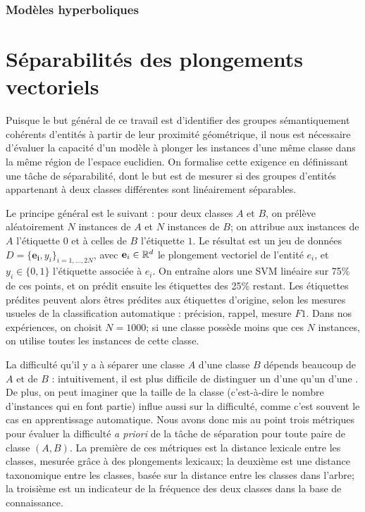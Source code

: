 \subsubsection{Modèles hyperboliques}


\section{Séparabilités des plongements vectoriels}

Puisque le but général de ce travail est d'identifier des groupes sémantiquement cohérents d'entités à partir de leur proximité géométrique, il nous est nécessaire d'évaluer la capacité d'un modèle à plonger les instances d'une même classe dans la même région de l'espace euclidien. On formalise cette exigence en définissant une tâche de séparabilité, dont le but est de mesurer si des groupes d'entités appartenant à deux classes différentes sont linéairement séparables.

Le principe général est le suivant : pour deux classes $A$ et $B$, on prélève aléatoirement $N$ instances de $A$ et $N$ instances de $B$; on attribue aux instances de $A$ l'étiquette $0$ et à celles de $B$ l'étiquette $1$. Le résultat est un jeu de données $D = \{\mathbf{e_i}, y_i \}_{i=1, \ldots, 2N}$, avec $\mathbf{e}_i \in \mathbb{R}^d$ le plongement vectoriel de l'entité $e_i$, et $y_i \in \{ 0, 1\}$ l'étiquette associée à $e_i$. On entraîne alors une SVM linéaire sur 75\% de ces points, et on prédit ensuite les étiquettes des 25\% restant. Les étiquettes prédites peuvent alors êtres prédites aux étiquettes d'origine, selon les mesures usueles de la classification automatique : précision, rappel, mesure $F1$. Dans nos expériences, on choisit $N=1000$; si une classe possède moins que ces $N$ instances, on utilise toutes les instances de cette classe.


La difficulté qu'il y a à séparer une classe $A$ d'une classe $B$ dépends beaucoup de $A$ et de $B$ : intuitivement, il est plus difficile de distinguer un  d'une  qu'un  d'une . De plus, on peut imaginer que la taille de la classe (c'est-à-dire le nombre d'instances qui en font partie) influe aussi sur la difficulté, comme c'est souvent le cas en apprentissage automatique. Nous avons donc mis au point trois métriques pour évaluer la difficulté \textit{a priori} de la tâche de séparation pour toute paire de classe $(A, B)$. La première de ces métriques est la distance lexicale entre les classes, mesurée grâce à des plongements lexicaux; la deuxième est une distance taxonomique entre les classes, basée sur la distance entre les classes dans l'arbre; la troisième est un indicateur de la fréquence des deux classes dans la base de connaissance.

